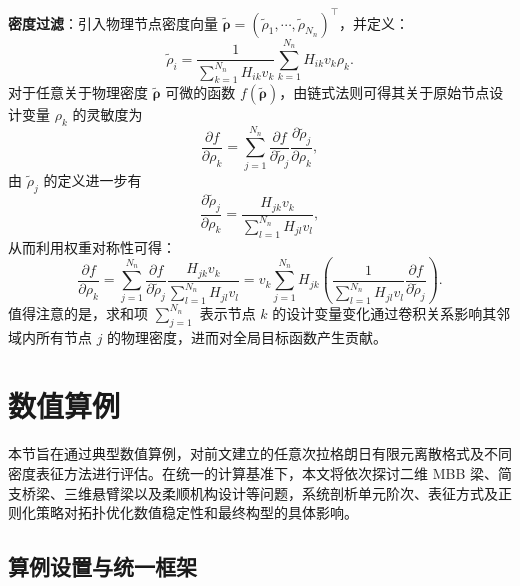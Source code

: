 \textbf{密度过滤}：引入物理节点密度向量 $\tilde{\boldsymbol{\rho}}=(\tilde{\rho}_1,\cdots,\tilde{\rho}_{N_n})^{\top}$，并定义：
\begin{equation} \label{eq:ch3_node_dens_filter}
	\tilde{\rho}_i = \frac{1}{\sum_{k=1}^{N_n} H_{ik}v_k}\sum_{k=1}^{N_n} H_{ik}v_k \rho_k.
\end{equation}
对于任意关于物理密度 $\tilde{\boldsymbol{\rho}}$ 可微的函数 $f(\tilde{\boldsymbol{\rho}})$，由链式法则可得其关于原始节点设计变量 $\rho_k$ 的灵敏度为
\[
\frac{\partial f}{\partial \rho_k} = \sum_{j=1}^{N_n} \frac{\partial f}{\partial \tilde{\rho}_j} \frac{\partial \tilde{\rho}_j}{\partial \rho_k},
\]
由 $\tilde{\rho}_j$ 的定义进一步有
\[
\frac{\partial \tilde{\rho}_j}{\partial \rho_k} = \frac{H_{jk}v_k}{\sum_{l=1}^{N_n}H_{jl}v_l},
\]
从而利用权重对称性可得：
\begin{equation} \label{eq:ch3_node_chain_rule}
	\frac{\partial f}{\partial \rho_k} = \sum_{j=1}^{N_n} \frac{\partial f}{\partial \tilde{\rho}_j} \frac{H_{jk}v_k}{\sum_{l=1}^{N_n}H_{jl}v_l} = v_k\sum_{j=1}^{N_n} H_{jk} \left( \frac{1}{\sum_{l=1}^{N_n}H_{jl}v_l} \frac{\partial f}{\partial \tilde{\rho}_j} \right).
\end{equation}
值得注意的是，求和项 $\sum_{j=1}^{N_n}$ 表示节点 $k$ 的设计变量变化通过卷积关系影响其邻域内所有节点 $j$ 的物理密度，进而对全局目标函数产生贡献。


\section{数值算例}
\label{sec:ch3_numerical_examples}

本节旨在通过典型数值算例，对前文建立的任意次拉格朗日有限元离散格式及不同密度表征方法进行评估。在统一的计算基准下，本文将依次探讨二维 MBB 梁、简支桥梁、三维悬臂梁以及柔顺机构设计等问题，系统剖析单元阶次、表征方式及正则化策略对拓扑优化数值稳定性和最终构型的具体影响。


\subsection{算例设置与统一框架}
\label{subsec:ch3_case_framework}

